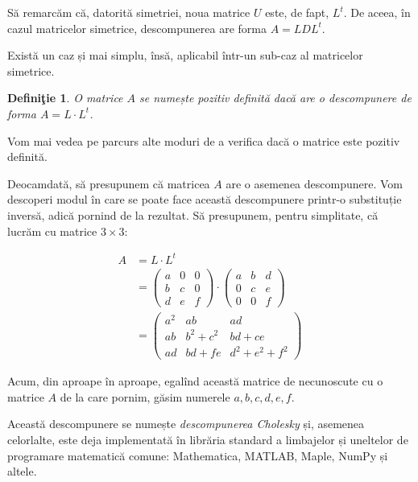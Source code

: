 \documentclass[11pt,a4paper]{article}
\theoremstyle{dotless}
\theoremstyle{dotlessdr}
\newtheorem{definition}{Defini\c{t}ie}[section]
\begin{document}
Să remarcăm că, datorită simetriei, noua matrice $U$ este, de fapt, $L^t$.
De aceea, în cazul matricelor simetrice, descompunerea are forma $A = LDL^t$.

Există un caz și mai simplu, însă, aplicabil într-un sub-caz al matricelor
simetrice.

\begin{definition}\label{def:m-poz-def}
  O matrice $A$ se numește \emph{pozitiv definită} dacă are o descompunere
  de forma $A = L \cdot L^t$.
\end{definition}

Vom mai vedea pe parcurs alte moduri de a verifica dacă o matrice este pozitiv
definită.

Deocamdată, să presupunem că matricea $A$ are o asemenea descompunere.
Vom descoperi modul în care se poate face această descompunere printr-o
substituție inversă, adică pornind de la rezultat. Să presupunem, pentru
simplitate, că lucrăm cu matrice $3 \times 3$:

\begin{align*}
  A &= L \cdot L^t \\
    &= \begin{pmatrix}
  a & 0 & 0 \\
  b & c & 0 \\
  d & e & f
\end{pmatrix} \cdot
\begin{pmatrix}
  a & b & d \\
  0 & c & e \\
  0 & 0 & f
\end{pmatrix} \\
&= \begin{pmatrix}
a^2 & ab & ad \\
ab & b^2 + c^2 & bd + ce \\
ad & bd + fe & d^2 + e^2 + f^2
\end{pmatrix}
\end{align*}

Acum, din aproape în aproape, egalînd această matrice de necunoscute cu
o matrice $A$ de la care pornim, găsim numerele $a, b, c, d, e, f$.

Această descompunere se numește \emph{descompunerea Cholesky} și, asemenea
celorlalte, este deja implementată în librăria standard a limbajelor și
uneltelor de programare matematică comune: Mathematica, MATLAB, Maple,
NumPy și altele.

\end{document}
